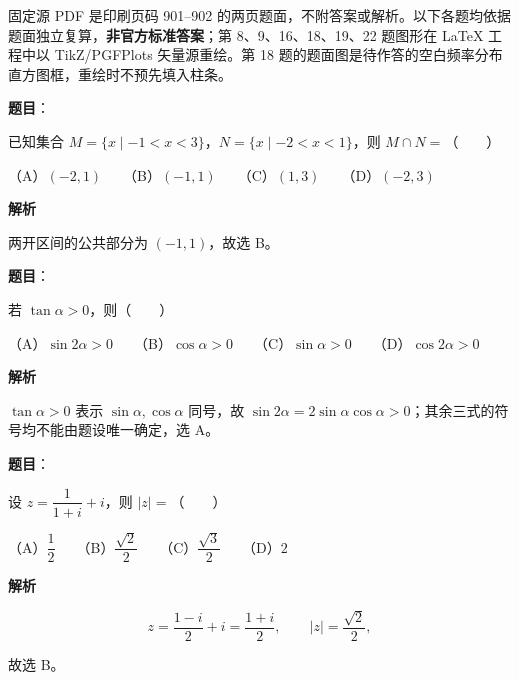 

\begin{gktip}
固定源 PDF 是印刷页码 901–902 的两页题面，不附答案或解析。以下各题均依据题面独立复算，\textbf{非官方标准答案}；第 8、9、16、18、19、22 题图形在 LaTeX 工程中以 TikZ/PGFPlots 矢量源重绘。第 18 题的题面图是待作答的空白频率分布直方图框，重绘时不预先填入柱条。
\end{gktip}


\begin{answer}

\textbf{题目}：

已知集合 $M=\{x\mid -1<x<3\}$，$N=\{x\mid -2<x<1\}$，则 $M\cap N=$\mbox{（　　）}

（A）$(-2,1)$　　（B）$(-1,1)$　　（C）$(1,3)$　　（D）$(-2,3)$

\textbf{解析}

两开区间的公共部分为 $(-1,1)$，故选 B。


\end{answer}
\begin{answer}

\textbf{题目}：

若 $\tan\alpha>0$，则\mbox{（　　）}

（A）$\sin2\alpha>0$　　（B）$\cos\alpha>0$　　（C）$\sin\alpha>0$　　（D）$\cos2\alpha>0$

\textbf{解析}

$\tan\alpha>0$ 表示 $\sin\alpha,\cos\alpha$ 同号，故 $\sin2\alpha=2\sin\alpha\cos\alpha>0$；其余三式的符号均不能由题设唯一确定，选 A。


\end{answer}
\begin{answer}

\textbf{题目}：

设 $z=\dfrac1{1+i}+i$，则 $|z|=$\mbox{（　　）}

（A）$\dfrac12$　　（B）$\dfrac{\sqrt2}{2}$　　（C）$\dfrac{\sqrt3}{2}$　　（D）$2$

\textbf{解析}

\nopagebreak[4]
\[
z=\frac{1-i}{2}+i=\frac{1+i}{2},\qquad |z|=\frac{\sqrt2}{2},
\]

故选 B。


\end{answer}
